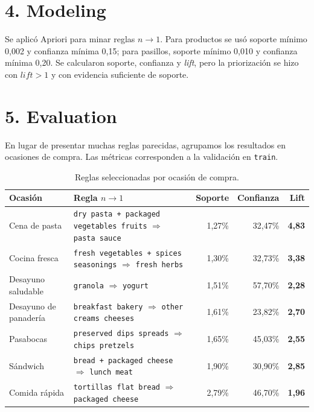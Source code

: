 \documentclass[10pt,letterpaper]{article}
\newcommand{\pct}[1]{#1\%}
\begin{document}
\section*{4. Modeling}

Se aplicó Apriori para minar reglas $n\rightarrow1$. Para productos se usó soporte mínimo 0,002 y confianza mínima 0,15; para pasillos, soporte mínimo 0,010 y confianza mínima 0,20. Se calcularon soporte, confianza y \textit{lift}, pero la priorización se hizo con $\textit{lift}>1$ y con evidencia suficiente de soporte.

\section*{5. Evaluation}

En lugar de presentar muchas reglas parecidas, agrupamos los resultados en ocasiones de compra. Las métricas corresponden a la validación en \texttt{train}.

\begin{table}[H]
\centering
\caption{Reglas seleccionadas por ocasión de compra.}
\scriptsize
\begin{tabularx}{\linewidth}{Y Y rrr}
\toprule
Ocasión & Regla $n\rightarrow1$ & Soporte & Confianza & Lift \\
\midrule
Cena de pasta & \texttt{dry pasta + packaged vegetables fruits} $\Rightarrow$ \texttt{pasta sauce} & \pct{1,27} & \pct{32,47} & \textbf{4,83} \\
Cocina fresca & \texttt{fresh vegetables + spices seasonings} $\Rightarrow$ \texttt{fresh herbs} & \pct{1,30} & \pct{32,73} & \textbf{3,38} \\
Desayuno saludable & \texttt{granola} $\Rightarrow$ \texttt{yogurt} & \pct{1,51} & \pct{57,70} & \textbf{2,28} \\
Desayuno de panadería & \texttt{breakfast bakery} $\Rightarrow$ \texttt{other creams cheeses} & \pct{1,61} & \pct{23,82} & \textbf{2,70} \\
Pasabocas & \texttt{preserved dips spreads} $\Rightarrow$ \texttt{chips pretzels} & \pct{1,65} & \pct{45,03} & \textbf{2,55} \\
Sándwich & \texttt{bread + packaged cheese} $\Rightarrow$ \texttt{lunch meat} & \pct{1,90} & \pct{30,90} & \textbf{2,85} \\
Comida rápida & \texttt{tortillas flat bread} $\Rightarrow$ \texttt{packaged cheese} & \pct{2,79} & \pct{46,70} & \textbf{1,96} \\
\bottomrule
\end{tabularx}
\end{table}
\end{document}
